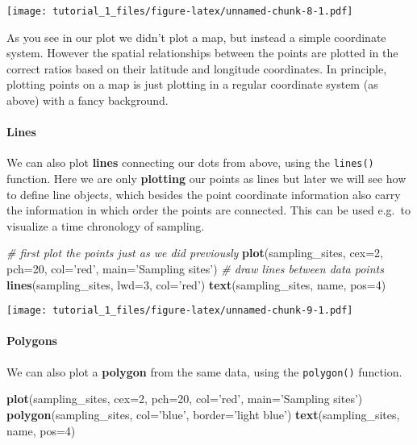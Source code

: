 \documentclass[]{article}
\newenvironment{Shaded}{\begin{snugshade}}{\end{snugshade}}
\newcommand{\CommentTok}[1]{\textcolor[rgb]{0.56,0.35,0.01}{\textit{#1}}}
\newcommand{\DataTypeTok}[1]{\textcolor[rgb]{0.13,0.29,0.53}{#1}}
\newcommand{\DecValTok}[1]{\textcolor[rgb]{0.00,0.00,0.81}{#1}}
\newcommand{\KeywordTok}[1]{\textcolor[rgb]{0.13,0.29,0.53}{\textbf{#1}}}
\newcommand{\NormalTok}[1]{#1}
\newcommand{\StringTok}[1]{\textcolor[rgb]{0.31,0.60,0.02}{#1}}
\let\oldparagraph\paragraph
\renewcommand{\paragraph}[1]{\oldparagraph{#1}\mbox{}}
\begin{document}
\texttt{[image: tutorial\_1\_files/figure-latex/unnamed-chunk-8-1.pdf]}

As you see in our plot we didn't plot a map, but instead a simple
coordinate system. However the spatial relationships between the points
are plotted in the correct ratios based on their latitude and longitude
coordinates. In principle, plotting points on a map is just plotting in
a regular coordinate system (as above) with a fancy background.

\hypertarget{lines}{%
\paragraph{Lines}\label{lines}}

We can also plot \textbf{lines} connecting our dots from above, using
the \texttt{lines()} function. Here we are only \textbf{plotting} our
points as lines but later we will see how to define line objects, which
besides the point coordinate information also carry the information in
which order the points are connected. This can be used e.g.~to visualize
a time chronology of sampling.

\begin{Shaded}
\begin{Highlighting}[]
\CommentTok{# first plot the points just as we did previously}
\KeywordTok{plot}\NormalTok{(sampling_sites, }\DataTypeTok{cex=}\DecValTok{2}\NormalTok{, }\DataTypeTok{pch=}\DecValTok{20}\NormalTok{, }\DataTypeTok{col=}\StringTok{'red'}\NormalTok{, }\DataTypeTok{main=}\StringTok{'Sampling sites'}\NormalTok{)}
\CommentTok{# draw lines between data points}
\KeywordTok{lines}\NormalTok{(sampling_sites, }\DataTypeTok{lwd=}\DecValTok{3}\NormalTok{, }\DataTypeTok{col=}\StringTok{'red'}\NormalTok{)}
\KeywordTok{text}\NormalTok{(sampling_sites, name, }\DataTypeTok{pos=}\DecValTok{4}\NormalTok{)}
\end{Highlighting}
\end{Shaded}

\texttt{[image: tutorial\_1\_files/figure-latex/unnamed-chunk-9-1.pdf]}

\hypertarget{polygons}{%
\paragraph{Polygons}\label{polygons}}

We can also plot a \textbf{polygon} from the same data, using the
\texttt{polygon()} function.

\begin{Shaded}
\begin{Highlighting}[]
\KeywordTok{plot}\NormalTok{(sampling_sites, }\DataTypeTok{cex=}\DecValTok{2}\NormalTok{, }\DataTypeTok{pch=}\DecValTok{20}\NormalTok{, }\DataTypeTok{col=}\StringTok{'red'}\NormalTok{, }\DataTypeTok{main=}\StringTok{'Sampling sites'}\NormalTok{)}
\KeywordTok{polygon}\NormalTok{(sampling_sites, }\DataTypeTok{col=}\StringTok{'blue'}\NormalTok{, }\DataTypeTok{border=}\StringTok{'light blue'}\NormalTok{)}
\KeywordTok{text}\NormalTok{(sampling_sites, name, }\DataTypeTok{pos=}\DecValTok{4}\NormalTok{)}
\end{Highlighting}
\end{Shaded}
\end{document}
